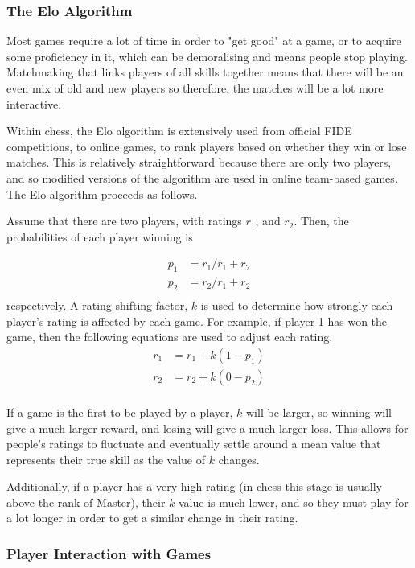 \subsubsection{The Elo Algorithm}
\vs
Most games require a lot of time in order to "get good" at a game, or to acquire some proficiency in it, which can be demoralising and means people stop playing. Matchmaking that links players of all skills together means that there will be an even mix of old and new players so therefore, the matches will be a lot more interactive.


\vs
Within chess, the Elo algorithm is extensively used from official FIDE competitions, to online games, to rank players based on whether they win or lose matches. This is relatively straightforward because there are only two players, and so modified versions of the algorithm are used in online team-based games. The Elo algorithm proceeds as follows.

Assume that there are two players, with ratings $r_1$, and $r_2$. Then, the probabilities of each player winning is 

\begin{align*}
    p_1 &= r_1/r_1 + r_2\\
    p_2 &= r_2/r_1 + r_2\\
\end{align*}
respectively. A rating shifting factor, $k$ is used to determine how strongly each player's rating is affected by each game. For example, if player 1 has won the game, then the following equations are used to adjust each rating.
\begin{align*}
    r_1 &= r_1 + k(1 - p_1)\\
    r_2 &= r_2 + k(0 - p_2)\\
\end{align*}

If a game is the first to be played by a player, $k$ will be larger, so winning will give a much larger reward, and losing will give a much larger loss. This allows for people's ratings to fluctuate and eventually settle around a mean value that represents their true skill as the value of $k$ changes.

\vs
Additionally, if a player has a very high rating (in chess this stage is usually above the rank of Master), their $k$ value is much lower, and so they must play for a lot longer in order to get a similar change in their rating.

\subsubsection{Player Interaction with Games}

